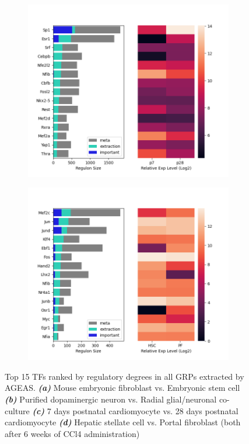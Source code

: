 \documentclass[fleqn,10pt]{wlscirep}
\begin{document}
\begin{figure}
  \begin{subfigure}{0.49\linewidth}
    \centering
    \includegraphics[width=\linewidth, keepaspectratio,]{../images/top_TFs/CMp7d_CMp28d.png}
    \caption{}
  \end{subfigure}
  \begin{subfigure}{0.49\linewidth}
    \centering
    \includegraphics[width=\linewidth, keepaspectratio,]{../images/top_TFs/HSCp6w_PFp6w.png}
    \caption{}
  \end{subfigure}

  \caption{
    Top 15 TFs ranked by regulatory degrees in all GRPs extracted by AGEAS.
    \textbf{\emph{(a)}} Mouse embryonic fibroblast vs. Embryonic stem cell
    \textbf{\emph{(b)}} Purified dopaminergic neuron vs. Radial glial/neuronal co-culture
    \textbf{\emph{(c)}} 7 days postnatal cardiomyocyte vs. 28 days postnatal cardiomyocyte
    \textbf{\emph{(d)}} Hepatic stellate cell vs. Portal fibroblast (both after 6 weeks of CCl4 administration)
  }
  \label{result_figs}
\end{figure}
\end{document}
